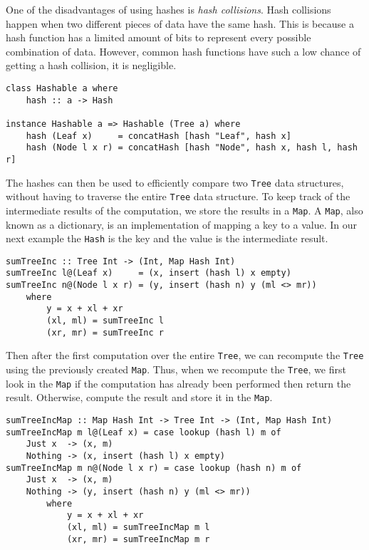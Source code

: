 One of the disadvantages of using hashes is \textit{hash collisions}. Hash collisions happen when two different pieces of data have the same hash. This is because a hash function has a limited amount of bits to represent every possible combination of data. However, common hash functions have such a low chance of getting a hash collision, it is negligible. 

\begin{verbatim}
class Hashable a where
    hash :: a -> Hash

instance Hashable a => Hashable (Tree a) where
    hash (Leaf x)     = concatHash [hash "Leaf", hash x]
    hash (Node l x r) = concatHash [hash "Node", hash x, hash l, hash r]
\end{verbatim}

The hashes can then be used to efficiently compare two \texttt{Tree} data structures, without having to traverse the entire \texttt{Tree} data structure. To keep track of the intermediate results of the computation, we store the results in a \texttt{Map}. A \texttt{Map}, also known as a dictionary, is an implementation of mapping a key to a value. In our next example the \texttt{Hash} is the key and the value is the intermediate result.

\begin{verbatim}
sumTreeInc :: Tree Int -> (Int, Map Hash Int)
sumTreeInc l@(Leaf x)     = (x, insert (hash l) x empty)
sumTreeInc n@(Node l x r) = (y, insert (hash n) y (ml <> mr))
    where
        y = x + xl + xr
        (xl, ml) = sumTreeInc l
        (xr, mr) = sumTreeInc r
\end{verbatim}

Then after the first computation over the entire \texttt{Tree}, we can recompute the \texttt{Tree} using the previously created \texttt{Map}. Thus, when we recompute the \texttt{Tree}, we first look in the \texttt{Map} if the computation has already been performed then return the result. Otherwise, compute the result and store it in the \texttt{Map}.

\begin{verbatim}
sumTreeIncMap :: Map Hash Int -> Tree Int -> (Int, Map Hash Int)
sumTreeIncMap m l@(Leaf x) = case lookup (hash l) m of
    Just x  -> (x, m) 
    Nothing -> (x, insert (hash l) x empty)
sumTreeIncMap m n@(Node l x r) = case lookup (hash n) m of
    Just x  -> (x, m)
    Nothing -> (y, insert (hash n) y (ml <> mr))
        where
            y = x + xl + xr
            (xl, ml) = sumTreeIncMap m l
            (xr, mr) = sumTreeIncMap m r
\end{verbatim}

